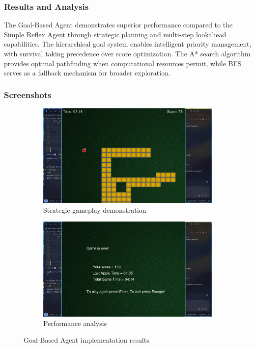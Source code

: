 \documentclass[11pt,a4paper]{article}
\begin{document}
\subsubsection{Results and Analysis}
The Goal-Based Agent demonstrates superior performance compared to the Simple Reflex Agent through strategic planning and multi-step lookahead capabilities. The hierarchical goal system enables intelligent priority management, with survival taking precedence over score optimization. The A* search algorithm provides optimal pathfinding when computational resources permit, while BFS serves as a fallback mechanism for broader exploration.

\subsubsection{Screenshots}
\begin{figure}[H]
    \centering
    \begin{subfigure}{0.6\textwidth}
        \includegraphics[width=\textwidth]{ss/goal_based_play.png}
        \caption{Strategic gameplay demonstration}
    \end{subfigure}
    \hfill
    \begin{subfigure}{0.6\textwidth}
        \includegraphics[width=\textwidth]{ss/goal_based_result.png}
        \caption{Performance analysis}
    \end{subfigure}
    \caption{Goal-Based Agent implementation results}
\end{figure}
\end{document}
